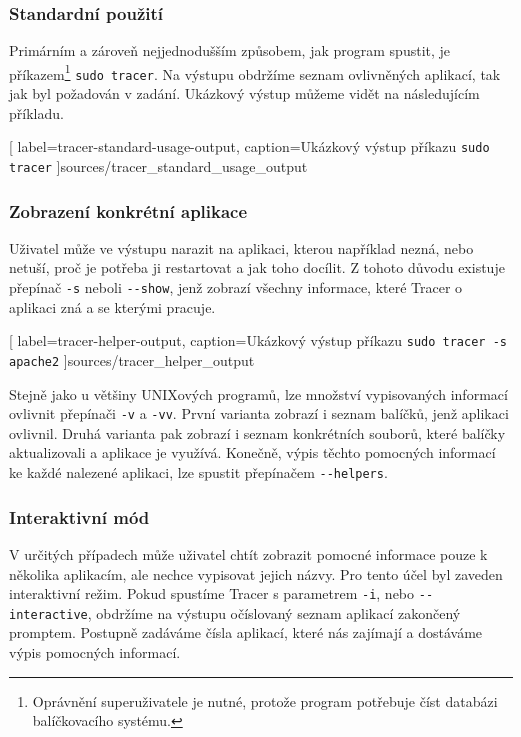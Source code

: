 \documentclass[
  field=inf,
  biblatex,
  glossaries,
  index
]{kidiplom}
\begin{document}
		\subsubsection{Standardní použití}
		Primárním a zároveň nejjednodušším způsobem, jak program spustit, je příkazem\footnote{Oprávnění superuživatele je nutné, protože program potřebuje číst databázi balíčkovacího systému.} \texttt{sudo tracer}. Na výstupu obdržíme seznam ovlivněných aplikací, tak jak byl požadován v zadání. Ukázkový výstup můžeme vidět na následujícím příkladu.

		
		[
			label=tracer-standard-usage-output,
			caption={Ukázkový výstup příkazu \texttt{sudo tracer}}
		]{sources/tracer_standard_usage_output}

		\pagebreak
		\subsubsection{Zobrazení konkrétní aplikace}
		Uživatel může ve výstupu narazit na aplikaci, kterou například nezná, nebo netuší, proč je potřeba ji restartovat a jak toho docílit. Z tohoto důvodu existuje přepínač \texttt{-s} neboli \texttt{-{}-show}, jenž zobrazí všechny informace, které Tracer o aplikaci zná a se kterými pracuje.

		
		[
			label=tracer-helper-output,
			caption={Ukázkový výstup příkazu \texttt{sudo tracer -s apache2}}
		]{sources/tracer_helper_output}

		Stejně jako u většiny UNIXových programů, lze množství vypisovaných informací ovlivnit přepínači \texttt{-v} a \texttt{-vv}. První varianta zobrazí i seznam balíčků, jenž aplikaci ovlivnil. Druhá varianta pak zobrazí i seznam konkrétních souborů, které balíčky aktualizovali a aplikace je využívá. Konečně, výpis těchto pomocných informací ke každé nalezené aplikaci, lze spustit přepínačem \texttt{-{}-helpers}.

		\subsubsection{Interaktivní mód}
		V určitých případech může uživatel chtít zobrazit pomocné informace pouze k několika aplikacím, ale nechce vypisovat jejich názvy. Pro tento účel byl zaveden interaktivní režim. Pokud spustíme Tracer s parametrem \texttt{-i}, nebo \texttt{-{}-interactive}, obdržíme na výstupu očíslovaný seznam aplikací zakončený promptem. Postupně zadáváme čísla aplikací, které nás zajímají a dostáváme výpis pomocných informací.
\end{document}
